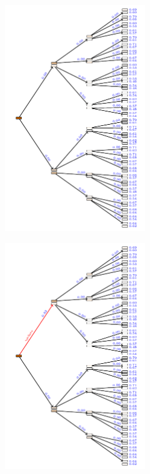 \documentclass[aspectratio=169]{beamer}
\begin{document}
\begin{landscape}
    \begin{frame}
        \begin{figure}
            \includegraphics[width=0.55\textwidth]{trees/1/tex_tree_0.pdf}
        \end{figure}
    \end{frame}
\end{landscape}

\begin{landscape}
    \begin{frame}
        \begin{figure}
            \includegraphics[width=0.55\textwidth]{trees/1/tex_tree_1.pdf}
        \end{figure}
    \end{frame}
\end{landscape}
\end{document}
